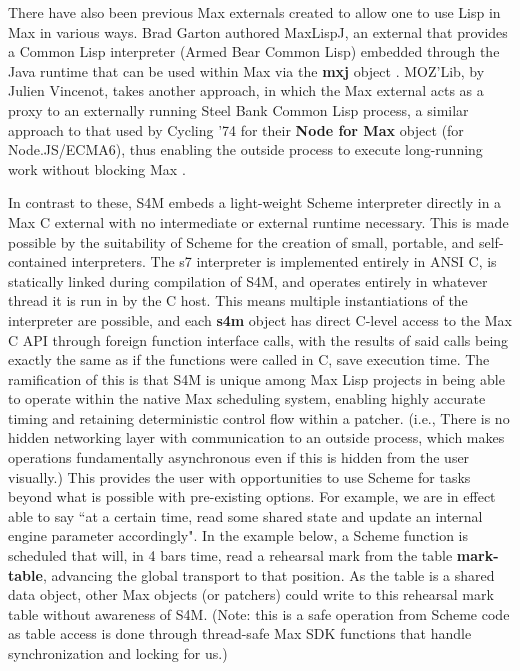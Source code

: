 \documentclass[acmsmall, anonymous, review]{acmart}
\begin{document}
There have also been previous Max externals created to allow one to use Lisp in Max in various ways.
Brad Garton authored MaxLispJ, an external that provides a Common Lisp interpreter 
(Armed Bear Common Lisp) embedded through the Java runtime that can be used within Max 
via the \textbf{mxj} object \cite{Garton2011}.
MOZ'Lib, by Julien Vincenot, takes another approach, in which the Max external
acts as a proxy to an externally running Steel Bank Common Lisp process,
a similar approach to that used by Cycling '74 for their \textbf{Node for Max} object (for Node.JS/ECMA6), 
thus enabling the outside process to execute long-running work without blocking Max \cite{Vincenot2017}.

In contrast to these, S4M embeds a light-weight Scheme interpreter directly in a Max
C external with no intermediate or external runtime necessary. This is made possible by the suitability
of Scheme for the creation of small, portable, and self-contained interpreters.
The s7 interpreter is implemented entirely in ANSI C, is statically linked during compilation of S4M, 
and operates entirely in whatever thread it is run in by the C host.
This means multiple instantiations of the interpreter are possible, and
each \textbf{s4m} object has direct C-level access to the Max C API 
through foreign function interface calls, with the results of said calls being exactly 
the same as if the functions were called in C, save execution time. 
The ramification of this is that S4M is unique among Max Lisp projects in being
able to operate within the native Max scheduling system, enabling highly accurate
timing and retaining deterministic control flow within a patcher. (i.e., There
is no hidden networking layer with communication to an outside process, which 
makes operations fundamentally asynchronous even if this is hidden from the user visually.)
This provides the user with opportunities to use Scheme for tasks beyond
what is possible with pre-existing options. For example, we are in effect 
able to say ``at a certain time, read some shared state and update an 
internal engine parameter accordingly". In the example below, a Scheme function
is scheduled that will, in 4 bars time, read a rehearsal mark from the table \textbf{mark-table},
advancing the global transport to that position. As the table
is a shared data object, other Max objects (or patchers) could write to this
rehearsal mark table without awareness of S4M. (Note: this is a safe operation
from Scheme code as table access is done through thread-safe Max SDK functions 
that handle synchronization and locking for us.)
\end{document}
